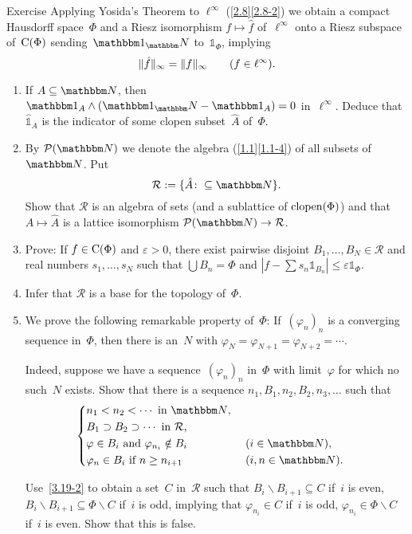 \documentclass[main.tex]{subfiles}
\begin{document}
\begin{psec}{3.19}{Exercise}
Applying Yosida's Theorem to $\ell^\infty$ (\ref{2.8}\ref{2.8-2})
we obtain a compact Hausdorff space~$\Phi$
and a Riesz isomorphism $f\mapsto \hat{f}$
of~$\ell^\infty$ onto a Riesz subspace of~$\mathrm{C}(\Phi)$
sending~$\mathbb{1}_\N$ to~$\mathbb{1}_\Phi$,
implying
\begin{equation*}
\|\hat{f}\|_\infty = \|f\|_\infty \qquad (f\in \ell^\infty)\text{.}
\end{equation*}
\begin{enumerate}
\item \label{3.19-1}
If $A\subseteq \N$,
then $\mathbb{1}_A \wedge (\mathbb{1}_\N - \mathbb{1}_A)=0$
in~$\ell^\infty$.
Deduce that~$\hat{\mathbb{1}}_A$ is the indicator
of some clopen subset~$\hat{A}$ of~$\Phi$.
%
\item \label{3.19-2}
By $\mathcal{P}(\N)$ we denote the algebra (\ref{1.1}\ref{1.1-4})
of all subsets of~$\N$.
Put
\begin{equation*}
\mathcal{R}:=\{ \hat{A}\colon \subseteq \N \}\htam{.}
\end{equation*}
Show that $\mathcal{R}$ is an algebra of sets
(and a sublattice of $\mathrm{clopen}(\Phi)$)
and that $A\mapsto \hat{A}$
is a lattice isomorphism $\mathcal{P}(\N)\ra \mathcal{R}$.
%
\item \label{3.19-3}
Prove: If $f\in\mathrm{C}(\Phi)$ and $\varepsilon>0$,
there exist pairwise disjoint $B_1,\dotsc,B_N\in\mathcal{R}$
and real numbers $s_1,\dotsc,s_N$
such that $\bigcup B_n = \Phi$
and $| f- \sum s_n \mathbb{1}_{B_n}| \leq \varepsilon \mathbb{1}_\Phi$.
%
\item \label{3.19-4}
Infer that $\mathcal{R}$ is a base for the topology of~$\Phi$.
%
\item \label{3.19-5}
We prove the following remarkable property of~$\Phi$:
If~$(\varphi_n)_n$ is a converging sequence in~$\Phi$,
then there is an~$N$ with $\varphi_N=\varphi_{N+1}=\varphi_{N+2}=\dotsb$.

Indeed,
suppose we have a sequence~$(\varphi_n)_n$ in~$\Phi$
with limit~$\varphi$
for which no such~$N$ exists.
Show that there is a sequence 
$n_1,B_1,n_2,B_2,n_3,\dotsc$ 
such that
\begin{equation*}
\left\{
\begin{aligned}
&n_1 < n_2 < \dotsb\htam{ in }\N\htam{, } \\
&B_1\supset B_2 \supset \dotsb\htam{ in }\mathcal{R}\htam{,} \\
&\varphi\in B_i\htam{ and } \varphi_{n_i} \notin B_i \quad 
    &&(i\in \N)\htam{,} \\
&\varphi_n\in B_i\htam{ if }n\geq n_{i+1} 
    && (i,n\in \N)\htam{.}
\end{aligned}
\right. 
\end{equation*}

Use~\ref{3.19-2} to obtain a set~$C$ in~$\mathcal{R}$
such that $B_i \backslash B_{i+1}\subseteq C$
if~$i$ is even,
$B_i \backslash B_{i+1} \subseteq \Phi\backslash C$
if~$i$ is odd, 
implying that $\varphi_{n_i}\in C$
if~$i$ is odd,
$\varphi_{n_i}\in\Phi\backslash C$
if~$i$ is even.
Show that this is false.
\end{enumerate}
\end{psec}
\clearpage
\end{document}
